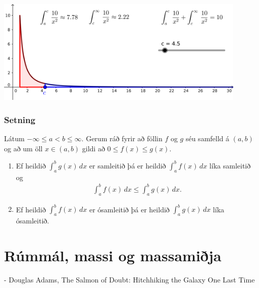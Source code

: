 \documentclass[b5paper,10pt,icelandic]{sphinxmanual}
\begin{document}
\begin{center}
\includegraphics[width=12cm,keepaspectratio=true]{07_samleitidheildi.png}
\end{center}



\subsection{Setning}
\label{\detokenize{kafli06:id11}}
Látum \(-\infty\leq a<b\leq \infty\). Gerum ráð fyrir að föllin
\(f\) og \(g\) séu samfelld á \((a, b)\) og að um öll
\(x\in (a, b)\) gildi að \(0\leq f(x)\leq g(x)\).
\begin{enumerate}
\item {} 
Ef heildið \(\int_a^b g(x)\,dx\) er samleitið þá er heildið
\(\int_a^b f(x)\,dx\) líka samleitið og
\begin{equation*}
\begin{split}\int_a^b f(x)\,dx \leq \int_a^b g(x)\,dx.\end{split}
\end{equation*}
\item {} 
Ef heildið \(\int_a^b f(x)\,dx\) er ósamleitið þá er heildið
\(\int_a^b g(x)\,dx\) líka ósamleitið.

\end{enumerate}


\chapter{Rúmmál, massi og massamiðja}
\label{\detokenize{kafli07:rummal-massi-og-massamija}}\label{\detokenize{kafli07::doc}}

- Douglas Adams, The Salmon of Doubt: Hitchhiking the Galaxy One Last Time
\end{document}
